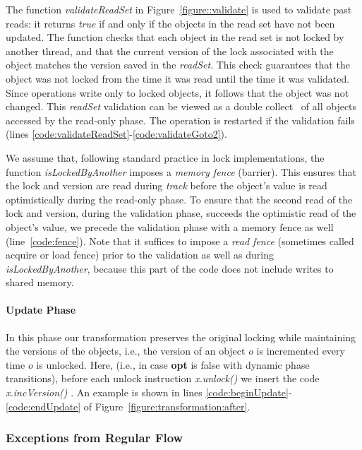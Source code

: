 The function \emph{validateReadSet} in Figure~\ref{figure::validate} is used to validate past reads: it returns \emph{true} if and only if the objects in the read set have not been updated.
%
The function checks that each object in the read set is not locked by another thread,
and that the current version of the lock associated with the object matches the version saved in the
\emph{readSet}.
This check guarantees that the object was not locked from the time it was read until
the time it was validated.
Since operations write only to
locked objects, it follows that the object was not changed.
This \emph{readSet} validation can be viewed as a double collect~\cite{Afek:1993:ASS:153724.153741}
of all objects accessed by the read-only phase.
%
The operation is restarted if the validation fails (lines \ref{code:validateReadSet}-\ref{code:validateGoto2}).

We assume that, following standard practice in lock implementations, 
the function \textit{isLockedByAnother} imposes a \emph{memory fence} (barrier). 
This ensures that the lock and version are read during \textit{track} before the object's value is read optimistically
during the read-only phase. 
To ensure that the second read of the lock and version, during the validation phase, succeeds the 
optimistic read of the object's value, we precede the validation phase with a memory fence as well (line~\ref{code:fence}).  
Note that it suffices to impose a \emph{read fence} (sometimes called acquire or load fence) 
prior to the validation as well as during \textit{isLockedByAnother}, because this part of the code does not include
writes to shared memory.

\paragraph{Update Phase}
In this phase our transformation preserves the original locking while maintaining the versions of the objects, i.e., the version of an object $o$ is incremented every time $o$ is unlocked.
Here, (i.e., in case  \textbf{opt} is false with dynamic phase transitions), 
before each unlock instruction \emph{\ttfamily x.unlock()} we insert the code \emph{\ttfamily x.incVersion()} .
An example is shown in lines \ref{code:beginUpdate}-\ref{code:endUpdate} of Figure~\ref{figure:transformation:after}.


\subsubsection{Exceptions from Regular Flow}
\label{sssec:alg-abnormal}


